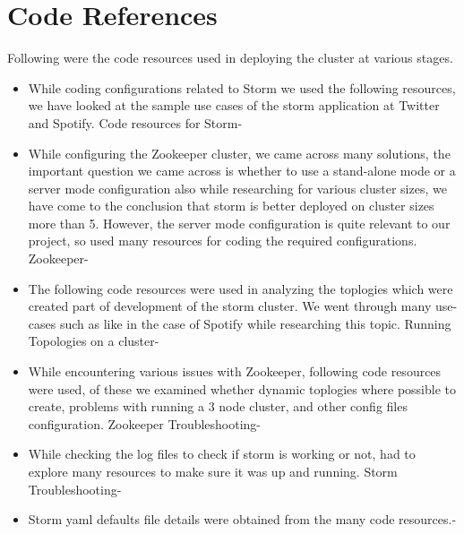 \documentclass[9pt,twocolumn,twoside]{../../styles/osajnl}
\begin{document}
\section{Code References}
Following were the code resources used in deploying the cluster at various
stages.
\begin{itemize}
\item
  While coding configurations related to Storm we used the following
  resources, we have looked at the sample use cases of the storm
  application at Twitter and Spotify. Code resources for
  Storm-\cite{www-storm1}\cite{www-storm2}\cite{www-storm3}\cite{www-storm4}\cite{www-storm5}\cite{www-storm6}\cite{www-storm7}\cite{www-storm8}\cite{www-storm9}\cite{www-storm10}
\item
 While configuring the Zookeeper cluster, we came across many
 solutions, the important question we came across is whether to use a
 stand-alone mode or a server mode configuration also while
 researching for various cluster sizes, we have come to the conclusion
 that storm is better deployed on cluster sizes more than 5. However,
 the server mode configuration is quite relevant to our project, so
 used many resources for coding the required
 configurations. Zookeeper-\cite{www-zk1}\cite{www-zk2}\cite{www-zk3}\cite{www-zk4}\cite{www-zk5}\cite{www-zk6}\cite{www-zk7}\cite{www-zk8}
\item The following code resources were used in analyzing the
  toplogies which were created part of development of the storm
  cluster. We went through many use-cases such as like in the case of
  Spotify while researching this topic. Running Topologies on a
  cluster-\cite{www-rtc1}\cite{www-rtc2}\cite{www-rtc3}\cite{www-rtc4}\cite{www-rtc5}\cite{www-rtc6}
\item While encountering various issues with Zookeeper, following code
  resources were used, of these we examined whether dynamic toplogies
  where possible to create, problems with running a 3 node cluster,
  and other config files configuration. Zookeeper
  Troubleshooting-\cite{www-zt1}\cite{www-zt2}\cite{www-zt3}\cite{www-zt4}\cite{www-zt5}\cite{www-zt6}
\item While checking the log files to check if storm is working or
  not, had to explore many resources to make sure it was up and
  running. Storm
  Troubleshooting-\cite{www-nnf1}\cite{www-nnf2}\cite{www-nnf3}\cite{www-nnf4}
\item Storm yaml defaults file details were obtained from the many
  code resources.-\cite{www-sd1}
\end{itemize}
\end{document}
